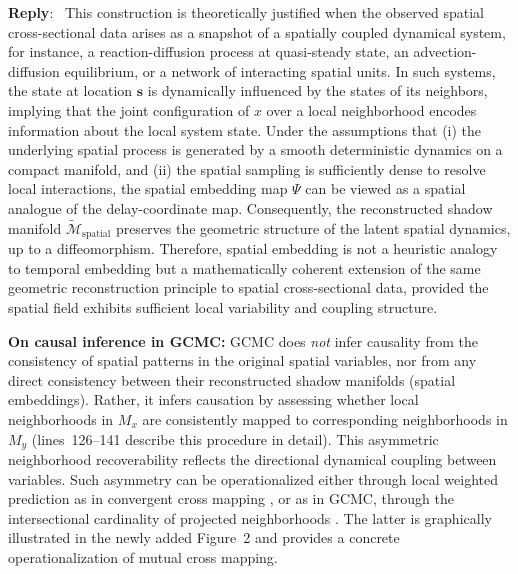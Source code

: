 \documentclass[11pt]{article}
\newenvironment{reply}
   {\medskip \noindent \color{blue} \begin{sf}\textbf{Reply}:\  }
   {\medskip \par \end{sf}}
\begin{document}
\begin{reply}
This construction is theoretically justified when the observed spatial cross-sectional data arises as a snapshot of a spatially coupled dynamical system, for instance, a reaction-diffusion process at quasi-steady state, an advection-diffusion equilibrium, or a network of interacting spatial units. In such systems, the state at location $\mathbf{s}$ is dynamically influenced by the states of its neighbors, implying that the joint configuration of $x$ over a local neighborhood encodes information about the local system state. Under the assumptions that (i) the underlying spatial process is generated by a smooth deterministic dynamics on a compact manifold, and (ii) the spatial sampling is sufficiently dense to resolve local interactions, the spatial embedding map $\Psi$ can be viewed as a spatial analogue of the delay-coordinate map. Consequently, the reconstructed shadow manifold $\tilde{\mathcal{M}}_{\text{spatial}}$ preserves the geometric structure of the latent spatial dynamics, up to a diffeomorphism. Therefore, spatial embedding is not a heuristic analogy to temporal embedding but a mathematically coherent extension of the same geometric reconstruction principle to spatial cross-sectional data, provided the spatial field exhibits sufficient local variability and coupling structure.

\textbf{On causal inference in GCMC:}  
GCMC does \textit{not} infer causality from the consistency of spatial patterns in the original spatial variables, nor from any direct consistency between their reconstructed shadow manifolds (spatial embeddings). Rather, it infers causation by assessing whether local neighborhoods in \(M_x\) are consistently mapped to corresponding neighborhoods in \(M_y\) (lines~126--141 describe this procedure in detail). This asymmetric neighborhood recoverability reflects the directional dynamical coupling between variables. Such asymmetry can be operationalized either through local weighted prediction as in convergent cross mapping \citep{sugihara1990simplex,sugihara2012ccm}, or as in GCMC, through the intersectional cardinality of projected neighborhoods \citep{tao2025cmc}. The latter is graphically illustrated in the newly added Figure~2 and provides a concrete operationalization of mutual cross mapping.


\end{reply}
\end{document}
